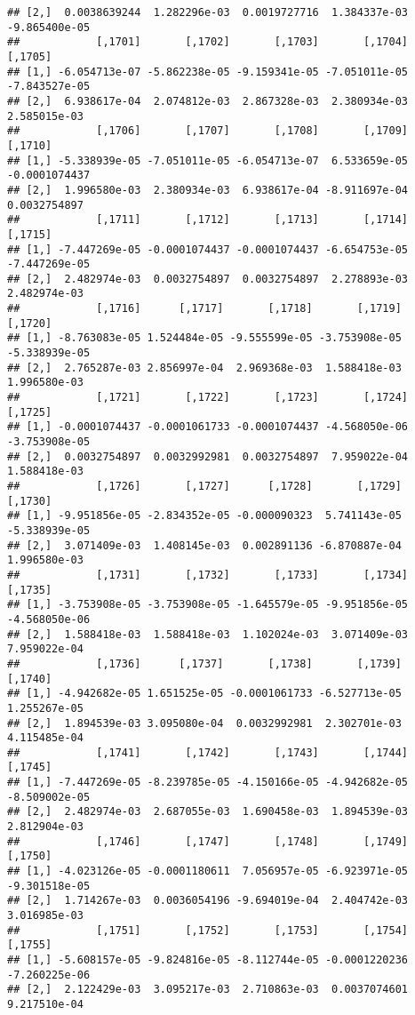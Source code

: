 \documentclass[
]{article}
\begin{document}
\begin{verbatim}
## [2,]  0.0038639244  1.282296e-03  0.0019727716  1.384337e-03 -9.865400e-05
##            [,1701]       [,1702]       [,1703]       [,1704]       [,1705]
## [1,] -6.054713e-07 -5.862238e-05 -9.159341e-05 -7.051011e-05 -7.843527e-05
## [2,]  6.938617e-04  2.074812e-03  2.867328e-03  2.380934e-03  2.585015e-03
##            [,1706]       [,1707]       [,1708]       [,1709]       [,1710]
## [1,] -5.338939e-05 -7.051011e-05 -6.054713e-07  6.533659e-05 -0.0001074437
## [2,]  1.996580e-03  2.380934e-03  6.938617e-04 -8.911697e-04  0.0032754897
##            [,1711]       [,1712]       [,1713]       [,1714]       [,1715]
## [1,] -7.447269e-05 -0.0001074437 -0.0001074437 -6.654753e-05 -7.447269e-05
## [2,]  2.482974e-03  0.0032754897  0.0032754897  2.278893e-03  2.482974e-03
##            [,1716]      [,1717]       [,1718]       [,1719]       [,1720]
## [1,] -8.763083e-05 1.524484e-05 -9.555599e-05 -3.753908e-05 -5.338939e-05
## [2,]  2.765287e-03 2.856997e-04  2.969368e-03  1.588418e-03  1.996580e-03
##            [,1721]       [,1722]       [,1723]       [,1724]       [,1725]
## [1,] -0.0001074437 -0.0001061733 -0.0001074437 -4.568050e-06 -3.753908e-05
## [2,]  0.0032754897  0.0032992981  0.0032754897  7.959022e-04  1.588418e-03
##            [,1726]       [,1727]      [,1728]       [,1729]       [,1730]
## [1,] -9.951856e-05 -2.834352e-05 -0.000090323  5.741143e-05 -5.338939e-05
## [2,]  3.071409e-03  1.408145e-03  0.002891136 -6.870887e-04  1.996580e-03
##            [,1731]       [,1732]       [,1733]       [,1734]       [,1735]
## [1,] -3.753908e-05 -3.753908e-05 -1.645579e-05 -9.951856e-05 -4.568050e-06
## [2,]  1.588418e-03  1.588418e-03  1.102024e-03  3.071409e-03  7.959022e-04
##            [,1736]      [,1737]       [,1738]       [,1739]      [,1740]
## [1,] -4.942682e-05 1.651525e-05 -0.0001061733 -6.527713e-05 1.255267e-05
## [2,]  1.894539e-03 3.095080e-04  0.0032992981  2.302701e-03 4.115485e-04
##            [,1741]       [,1742]       [,1743]       [,1744]       [,1745]
## [1,] -7.447269e-05 -8.239785e-05 -4.150166e-05 -4.942682e-05 -8.509002e-05
## [2,]  2.482974e-03  2.687055e-03  1.690458e-03  1.894539e-03  2.812904e-03
##            [,1746]       [,1747]       [,1748]       [,1749]       [,1750]
## [1,] -4.023126e-05 -0.0001180611  7.056957e-05 -6.923971e-05 -9.301518e-05
## [2,]  1.714267e-03  0.0036054196 -9.694019e-04  2.404742e-03  3.016985e-03
##            [,1751]       [,1752]       [,1753]       [,1754]       [,1755]
## [1,] -5.608157e-05 -9.824816e-05 -8.112744e-05 -0.0001220236 -7.260225e-06
## [2,]  2.122429e-03  3.095217e-03  2.710863e-03  0.0037074601  9.217510e-04

\end{verbatim}
\end{document}
